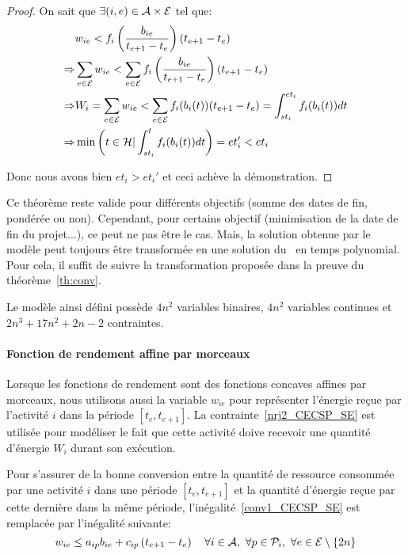 \begin{proof}
On sait que $\exists (i,e) \in {\cal A} \times {\cal E}$ tel que:
\begin{align*}
  &w_{ie} < f_i\left(\frac{b_{ie}}{t_{e+1}-t_e}\right)(t_{e+1}-t_e)\\  
  \Rightarrow &\sum_{e \in  {\cal E}} w_{ie} < \sum_{e \in {\cal E}} f_i\left(
                \frac{b_{ie}}{t_{e+1}-t_e}\right)(t_{e+1}-t_e)\\ 
  \Rightarrow & W_i=\sum_{e \in  {\cal E}} w_{ie} < \sum_{e \in {\cal E}}
                f_i(b_i(t))(t_{e+1}-t_e)=\int_{st_i}^{et_i}
                f_i(b_i(t))dt \\
  \Rightarrow & \min\left(t \in {\cal H} |
                \int_{st_i}^{t}f_i(b_i(t))dt\right) = et_i' < et_i                 
\end{align*}

Donc nous avons bien $et_i > et_i'$ et ceci achève la démonstration.
\end{proof}

Ce théorème reste valide pour différents objectifs (somme des dates de
fin, pondérée ou non). Cependant, pour certains objectif (minimisation
de la date de fin du projet...), ce peut ne pas être le cas. Mais, la
solution obtenue par le modèle peut toujours être transformée en une
solution du \CECSP~en temps polynomial. Pour cela, il suffit de suivre
la transformation proposée dans la preuve du théorème~\ref{th:conv}.

Le modèle ainsi défini possède $4n^2$ variables binaires, $4n^2$
variables continues et $2n^3+17n^2+2n-2$ contraintes.

\paragraph{Fonction de rendement affine par morceaux}

Lorsque les fonctions de rendement sont des fonctions concaves
affines par morceaux, nous utilisons aussi la variable $w_{ie}$ pour
représenter l'énergie reçue par l'activité $i$ dans la période
$[t_e,t_{e+1}]$. La contrainte~\eqref{nrj2_CECSP_SE} est utilisée pour
modéliser le fait que cette activité doive recevoir une quantité
d'énergie $W_i$ durant son exécution.

Pour s'assurer de la bonne conversion entre la quantité de ressource
consommée par une activité $i$ dans une période $[t_e,t_{e+1}]$ et la
quantité d'énergie reçue par cette dernière dans la même période,
l'inégalité~\eqref{conv1_CECSP_SE} est remplacée par l'inégalité
suivante:
\begin{equation}
w_{ie} \le a_{ip}b_{ie} + c_{ip}\left( t_{e+1} - t_e\right) \quad  
\forall i \in {\cal A},\ \forall p \in {\cal P}_i,\ \forall e \in {\cal E}\setminus\{2n\}  
\label{conv2_CECSP_SE}
\end{equation}

